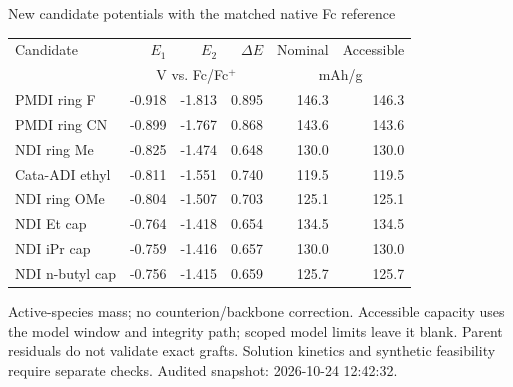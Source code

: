 \begin{frame}{New candidate potentials with the matched native Fc reference}
\scriptsize\renewcommand{\arraystretch}{1.25}\centering
\begin{tabular}{@{}p{4.7cm}rrrrr@{}}\toprule
Candidate & $E_1$ & $E_2$ & $\Delta E$ & Nominal & Accessible \\
& \multicolumn{3}{c}{V vs. Fc/Fc$^+$} & \multicolumn{2}{c}{mAh/g} \\ \midrule
PMDI ring F & -0.918 & -1.813 & 0.895 & 146.3 & 146.3 \\
PMDI ring CN & -0.899 & -1.767 & 0.868 & 143.6 & 143.6 \\
NDI ring Me & -0.825 & -1.474 & 0.648 & 130.0 & 130.0 \\
Cata-ADI ethyl & -0.811 & -1.551 & 0.740 & 119.5 & 119.5 \\
NDI ring OMe & -0.804 & -1.507 & 0.703 & 125.1 & 125.1 \\
NDI Et cap & -0.764 & -1.418 & 0.654 & 134.5 & 134.5 \\
NDI iPr cap & -0.759 & -1.416 & 0.657 & 130.0 & 130.0 \\
NDI n-butyl cap & -0.756 & -1.415 & 0.659 & 125.7 & 125.7 \\
\bottomrule\end{tabular}\par
\vspace{1ex}\raggedright
\footnotesize Active-species mass; no counterion/backbone correction. Accessible capacity uses the model window and integrity path; scoped model limits leave it blank.
\vspace{1ex}\scriptsize Parent residuals do not validate exact grafts. Solution kinetics and synthetic feasibility require separate checks.
\vfill\scriptsize Audited snapshot: 2026-10-24 12:42:32.
\end{frame}
